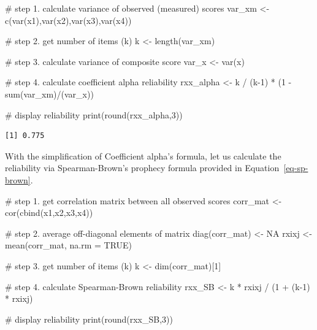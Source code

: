 \documentclass[
  letterpaper,
  DIV=11,
  numbers=noendperiod]{scrreprt}
\newenvironment{Shaded}{\begin{snugshade}}{\end{snugshade}}
\newcommand{\AttributeTok}[1]{\textcolor[rgb]{0.40,0.45,0.13}{#1}}
\newcommand{\CommentTok}[1]{\textcolor[rgb]{0.37,0.37,0.37}{#1}}
\newcommand{\ConstantTok}[1]{\textcolor[rgb]{0.56,0.35,0.01}{#1}}
\newcommand{\DecValTok}[1]{\textcolor[rgb]{0.68,0.00,0.00}{#1}}
\newcommand{\FunctionTok}[1]{\textcolor[rgb]{0.28,0.35,0.67}{#1}}
\newcommand{\NormalTok}[1]{\textcolor[rgb]{0.00,0.23,0.31}{#1}}
\newcommand{\OtherTok}[1]{\textcolor[rgb]{0.00,0.23,0.31}{#1}}
\newcommand{\SpecialCharTok}[1]{\textcolor[rgb]{0.37,0.37,0.37}{#1}}
\begin{document}
\begin{Shaded}
\begin{Highlighting}[]
\CommentTok{\# step 1. calculate variance of observed (measured) scores}
\NormalTok{var\_xm }\OtherTok{\textless{}{-}} \FunctionTok{c}\NormalTok{(}\FunctionTok{var}\NormalTok{(x1),}\FunctionTok{var}\NormalTok{(x2),}\FunctionTok{var}\NormalTok{(x3),}\FunctionTok{var}\NormalTok{(x4))}

\CommentTok{\# step 2. get number of items (k)}
\NormalTok{k }\OtherTok{\textless{}{-}} \FunctionTok{length}\NormalTok{(var\_xm)}

\CommentTok{\# step 3. calculate variance of composite score}
\NormalTok{var\_x }\OtherTok{\textless{}{-}} \FunctionTok{var}\NormalTok{(x)}

\CommentTok{\# step 4. calculate coefficient alpha reliability}
\NormalTok{rxx\_alpha }\OtherTok{\textless{}{-}}\NormalTok{ k }\SpecialCharTok{/}\NormalTok{ (k}\DecValTok{{-}1}\NormalTok{) }\SpecialCharTok{*}\NormalTok{ (}\DecValTok{1} \SpecialCharTok{{-}} \FunctionTok{sum}\NormalTok{(var\_xm)}\SpecialCharTok{/}\NormalTok{(var\_x))}

\CommentTok{\# display reliability}
\FunctionTok{print}\NormalTok{(}\FunctionTok{round}\NormalTok{(rxx\_alpha,}\DecValTok{3}\NormalTok{)) }
\end{Highlighting}
\end{Shaded}

\begin{verbatim}
[1] 0.775
\end{verbatim}

With the simplification of Coefficient alpha's formula, let us calculate
the reliability via Spearman-Brown's prophecy formula provided in
Equation~\ref{eq-sp-brown}.

\begin{Shaded}
\begin{Highlighting}[]
\CommentTok{\# step 1. get correlation matrix between all observed scores}
\NormalTok{corr\_mat }\OtherTok{\textless{}{-}} \FunctionTok{cor}\NormalTok{(}\FunctionTok{cbind}\NormalTok{(x1,x2,x3,x4))}

\CommentTok{\# step 2. average off{-}diagonal elements of matrix}
\FunctionTok{diag}\NormalTok{(corr\_mat) }\OtherTok{\textless{}{-}} \ConstantTok{NA}
\NormalTok{rxixj }\OtherTok{\textless{}{-}} \FunctionTok{mean}\NormalTok{(corr\_mat, }\AttributeTok{na.rm =} \ConstantTok{TRUE}\NormalTok{)}

\CommentTok{\# step 3. get number of items (k)}
\NormalTok{k }\OtherTok{\textless{}{-}} \FunctionTok{dim}\NormalTok{(corr\_mat)[}\DecValTok{1}\NormalTok{]}

\CommentTok{\# step 4. calculate Spearman{-}Brown reliability}
\NormalTok{rxx\_SB }\OtherTok{\textless{}{-}}\NormalTok{ k }\SpecialCharTok{*}\NormalTok{ rxixj }\SpecialCharTok{/}\NormalTok{ (}\DecValTok{1} \SpecialCharTok{+}\NormalTok{ (k}\DecValTok{{-}1}\NormalTok{) }\SpecialCharTok{*}\NormalTok{ rxixj)}

\CommentTok{\# display reliability}
\FunctionTok{print}\NormalTok{(}\FunctionTok{round}\NormalTok{(rxx\_SB,}\DecValTok{3}\NormalTok{)) }
\end{Highlighting}
\end{Shaded}
\end{document}
